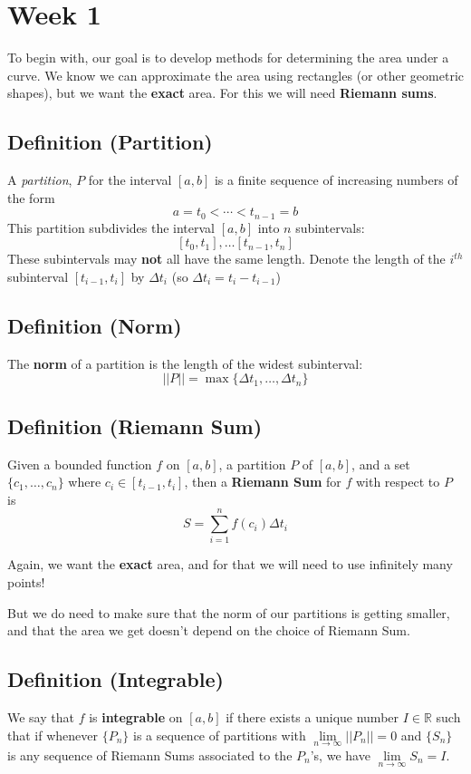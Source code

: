 \section{Week 1}
To begin with, our goal is to develop methods for determining the area under a curve.
We know we can approximate the area using rectangles (or other geometric shapes), but
we want the \textbf{exact} area. For this we will need \textbf{Riemann sums}.

\subsection{Definition (Partition)}
A \emph{partition}, $P$ for the interval $ [a,b] $ is a finite sequence of increasing
numbers of the form
\[ a=t_0<\cdots <t_{n-1}=b \]
This partition subdivides the interval $ [a,b] $ into $ n $ subintervals:
\[ [t_0,t_1],\ldots [t_{n-1},t_n] \]
These subintervals may \textbf{not} all have the same length.
Denote the length of the $ i^{th} $ subinterval $ [t_{i-1},t_i] $ by $ \Delta t_i $
(so $ \Delta t_i=t_i-t_{i-1} $)

\subsection{Definition (Norm)}
The \textbf{norm} of a partition is the length of the widest subinterval:
\[ ||P||=\max\{\Delta t_1,\dots,\Delta t_{n}\} \]

\subsection{Definition (Riemann Sum)}
Given a bounded function $ f $ on $ [a,b] $, a partition $ P $ of $ [a,b] $, and a set
$ \{c_1,\dots,c_n\} $ where $ c_i\in[t_{i-1},t_i] $, then a \textbf{Riemann Sum} for
$f$ with respect to $ P $ is
\[ S=\sum\limits_{i=1}^{n} f(c_i)\Delta t_i \]

Again, we want the \textbf{exact} area, and for that we will need to use infinitely
many points!

But we do need to make sure that the norm of our partitions is getting smaller,
and that the area we get doesn't depend on the choice of Riemann Sum.

\subsection{Definition (Integrable)}
We say that $ f $ is \textbf{integrable} on $ [a,b] $ if there exists a unique number
$ I\in\mathbb{R} $ such that if whenever $ \{P_n\} $ is a sequence of partitions with
$ \lim\limits_{{n} \to {\infty}} ||P_n||=0 $ and $ \{S_n\} $ is any sequence of
Riemann Sums associated to the $ P_n $'s, we have $ \lim\limits_{{n} \to {\infty}} S_n=I $.

